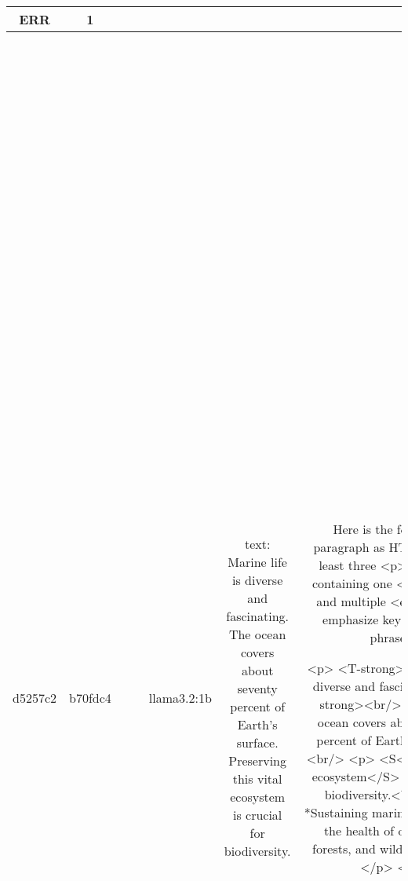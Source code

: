 \begin{table}[h!]
\begin{tabular}{|c|c|c|c|c|c|c|c|c|c|}
ERR & 1\\
\hline
d5257c2 & b70fdc4 &  &  & llama3.2:1b & text: Marine life is diverse and fascinating. The ocean covers about seventy percent of Earth's surface. Preserving this vital ecosystem is crucial for biodiversity. & Here is the formatted paragraph as HTML with at least three <p> tags, each containing one <strong> tag and multiple <em> tags to emphasize key words and phrases:

<p>
<T-strong>Marine life is diverse and fascinating.</T-strong><br/>
<p>
*The ocean covers about seventy percent of Earth's surface.*<br/>
<p>
<S<strong>Vital ecosystem</S> is crucial for biodiversity.<br/>
<p>
*Sustaining marine life relies on the health of our oceans, forests, and wildlife habitats.
</p>
<p> & err & The chatbot output does not comply with the description. Here is the reasoning:

1. There are more than three `<p>` tags, but not all use proper HTML syntax. The closing tags for all `<p>` tags are missing, except for the last one.
2. The output specifies the use of `<strong>` tags, but there are inconsistencies:
   - `<T-strong>` and `<S<strong>` are not valid HTML tags. The description specifies the use of a `<strong>` tag, but incorrect tags like `<T-strong>` and `<S<strong>` do not meet this requirement.
3. The output specifies the use of `<em>` tags, but there are asterisks used instead of `<em>` tags, which is not in compliance with HTML syntax.

These errors violate the directives of the chatbot's task to wrap sentences in HTML tags correctly, including the proper use of `<p>`, `<strong>`, and `<em>` tags.

ERR & 1\\
\hline
2cb9263 & b70fdc4 &  &  & gpt-4o-mini & text: Painting is a form of expression. Artists convey emotions through their work. Every brushstroke tells a part of their story. & ```html
<p><strong>Painting</strong> is a form of <em>expression</em>.</p>
<p><strong>Artists</strong> convey <em>emotions</em> through their <em>work</em>.</p>
<p>Every <strong>brushstroke</strong> tells a part of their <em>story</em>.</p>
``` & ok & The chatbot's output consists of three <p> tags, which meets the requirement that there should be at least three <p> tags. Each <p> tag includes at least one <strong> tag and contains multiple <em> tags, which complies with the requirement of having one <strong> tag and multiple <em> tags inside each <p> tag to emphasize key words and phrases. Since all the compliance requirements in the description that can be checked without the input are satisfied, the output aligns with the given description.


\end{tabular}
\end{table}
